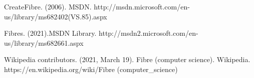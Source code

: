 CreateFibre. (2006). MSDN. http://msdn.microsoft.com/en-us/library/ms682402(VS.85).aspx

Fibres. (2021).MSDN Library. http://msdn2.microsoft.com/en-us/library/ms682661.aspx

Wikipedia contributors. (2021, March 19). Fibre (computer science). Wikipedia. https://en.wikipedia.org/wiki/Fibre (computer\_science)







